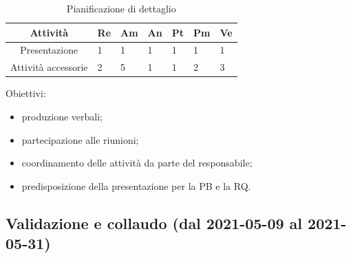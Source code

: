 \begin{table}[H]
	\centering
	\renewcommand{\arraystretch}{1.5}
	\begin{tabular}{|c|p{10mm}|p{10mm}|p{10mm}|p{10mm}|p{10mm}|p{10mm}|}
		\hline
		\rowcolor{lighter-grayer}
		\textbf{Attività}                         & \textbf{Re} & \textbf{Am} & \textbf{An} & \textbf{Pt} & \textbf{Pm} & \textbf{Ve} \\ \hline
		
		Presentazione       & 1           & 1           & 1           & 1           & 1           & 1           \\ \hline
		Attività accessorie & 2           & 5           & 1           & 1           & 2           & 3           \\ \hline
		
	\end{tabular}
	\caption{ Pianificazione di dettaglio\\}
\end{table}

Obiettivi:
\begin{itemize}
	\item produzione verbali;
	\item partecipazione alle riunioni;
	\item coordinamento delle attività da parte del responsabile;
	\item predisposizione della presentazione per la PB e la RQ.
\end{itemize}

\subsection{Validazione e collaudo (dal 2021-05-09 al 2021-05-31)}

